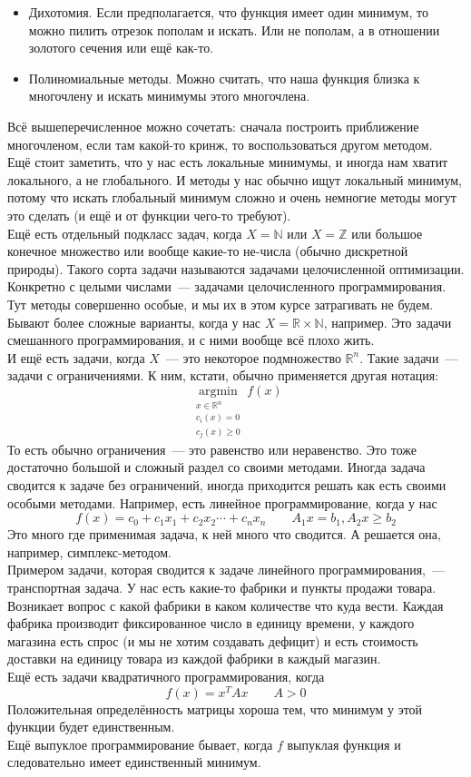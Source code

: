 \documentclass{article}
\begin{document}
    \begin{itemize}
        \item Дихотомия. Если предполагается, что функция имеет один минимум, то можно пилить отрезок пополам и искать. Или не пополам, а в отношении золотого сечения или ещё как-то.
        \item Полиномиальные методы. Можно считать, что наша функция близка к многочлену и искать минимумы этого многочлена.
    \end{itemize}
    Всё вышеперечисленное можно сочетать: сначала построить приближение многочленом, если там какой-то кринж, то воспользоваться другом методом.\\
    Ещё стоит заметить, что у нас есть локальные минимумы, и иногда нам хватит локального, а не глобального. И методы у нас обычно ищут локальный минимум, потому что искать глобальный минимум сложно и очень немногие методы могут это сделать (и ещё и от функции чего-то требуют).\\
    Ещё есть отдельный подкласс задач, когда $X=\mathbb N$ или $X=\mathbb Z$ или большое конечное множество или вообще какие-то не-числа (обычно дискретной природы). Такого сорта задачи называются задачами целочисленной оптимизации. Конкретно с целыми числами~--- задачами целочисленного программирования. Тут методы совершенно особые, и мы их в этом курсе затрагивать не будем.\\
    Бывают более сложные варианты, когда у нас $X=\mathbb R\times\mathbb N$, например. Это задачи смешанного программирования, и с ними вообще всё плохо жить.\\
    И ещё есть задачи, когда $X$~--- это некоторое подмножество $\mathbb R^n$. Такие задачи~--- задачи с ограничениями. К ним, кстати, обычно применяется другая нотация:
    $$
    \operatorname*{argmin}_{\substack{x\in\mathbb R^n\\c_i(x)=0\\c_j(x)\geqslant0}}f(x)
    $$
    То есть обычно ограничения~--- это равенство или неравенство. Это тоже достаточно большой и сложный раздел со своими методами. Иногда задача сводится к задаче без ограничений, иногда приходится решать как есть своими особыми методами. Например, есть линейное программирование, когда у нас
    $$
    f(x)=c_0+c_1x_1+c_2x_2\cdots+c_nx_n\qquad A_1x=b_1,A_2x\geqslant b_2
    $$
    Это много где применимая задача, к ней много что сводится. А решается она, например, симплекс-методом.\\
    Примером задачи, которая сводится к задаче линейного программирования,~--- транспортная задача. У нас есть какие-то фабрики и пункты продажи товара. Возникает вопрос с какой фабрики в каком количестве что куда вести. Каждая фабрика производит фиксированное число в единицу времени, у каждого магазина есть спрос (и мы не хотим создавать дефицит) и есть стоимость доставки на единицу товара из каждой фабрики в каждый магазин.\\
    Ещё есть задачи квадратичного программирования, когда
    $$
    f(x)=x^TAx\qquad A>0
    $$
    Положительная определённость матрицы хороша тем, что минимум у этой функции будет единственным.\\
    Ещё выпуклое программирование бывает, когда $f$ выпуклая функция и следовательно имеет единственный минимум.
\end{document}
